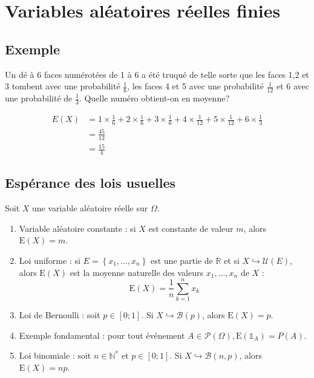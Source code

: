 \documentclass[../main.tex]{subfiles}
\begin{document}
\setcounter{chapter}{32}
\chapter{Variables aléatoires réelles finies}
\tableofcontents
\clearpage

\section{Exemple}
\begin{tcolorbox}[title=Exemple 33.3, title filled=false, colframe=darkgreen, colback=darkgreen!10!white]
    Un dé à 6 faces numérotées de 1 à 6 a été truqué de telle sorte que les faces 1,2 et 3 tombent avec une probabilité $\frac{1}{6}$, les faces 4 et 5 avec une probabilité $\frac{1}{12}$ et 6 avec une probabilité de $\frac{1}{3}$. Quelle numéro obtient-on en moyenne?
\end{tcolorbox}

\begin{align*}
    E(X) &= 1\times \frac{1}{6} + 2\times \frac{1}{6} + 3\times \frac{1}{6} + 4\times \frac{1}{12} + 5\times \frac{1}{12} + 6\times \frac{1}{3} \\
    &= \frac{45}{12} \\
    &= \frac{15}{4}
\end{align*}

\section{Espérance des lois usuelles}
\begin{tcolorbox}[title=Théorème 33.4, title filled=false, colframe=orange, colback=orange!10!white]
    Soit $X$ une variable aléatoire réelle sur $\Omega$.
    \begin{enumerate}
        \item Variable aléatoire constante : si $X$ est constante de valeur $m$, alors $\mathrm{E}(X)=m$.
        \item Loi uniforme : si $E=\left\{x_1, \ldots, x_n\right\}$ est une partie de $\mathbb{R}$ et si $X \hookrightarrow \mathcal{U}(E)$, alors $\mathrm{E}(X)$ est la moyenne naturelle des valeurs $x_1, \ldots, x_n$ de $X$ :
        $$\mathrm{E}(X)=\frac{1}{n} \sum_{k=1}^n x_k$$
        \item Loi de Bernoulli : soit $p \in[0 ; 1]$. Si $X \hookrightarrow \mathcal{B}(p)$, alors $\mathrm{E}(X)=p$.
        \item Exemple fondamental : pour tout événement $A \in \mathcal{P}(\Omega), \mathrm{E}\left(\mathbb{1}_A\right)=P(A)$.
        \item Loi binomiale : soit $n \in \mathbb{N}^*$ et $p \in[0 ; 1]$. Si $X \hookrightarrow \mathcal{B}(n, p)$, alors $\mathrm{E}(X)=n p$. 
    \end{enumerate}
\end{tcolorbox}
\end{document}
